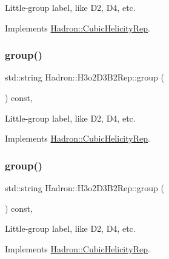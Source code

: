 Little-\/group label, like D2, D4, etc. 

Implements \mbox{\hyperlink{structHadron_1_1CubicHelicityRep_a101a7d76cd8ccdad0f272db44b766113}{Hadron\+::\+Cubic\+Helicity\+Rep}}.

\mbox{\label{structHadron_1_1H3o2D3B2Rep_a5f90a196c20d41622da336eefc77cfd1}} 
\subsubsection{\texorpdfstring{group()}{group()}\hspace{0.1cm}{\footnotesize\ttfamily [3/5]}}
{\footnotesize\ttfamily std\+::string Hadron\+::\+H3o2\+D3\+B2\+Rep\+::group (\begin{DoxyParamCaption}{ }\end{DoxyParamCaption}) const\hspace{0.3cm}{\ttfamily [inline]}, {\ttfamily [virtual]}}

Little-\/group label, like D2, D4, etc. 

Implements \mbox{\hyperlink{structHadron_1_1CubicHelicityRep_a101a7d76cd8ccdad0f272db44b766113}{Hadron\+::\+Cubic\+Helicity\+Rep}}.

\mbox{\label{structHadron_1_1H3o2D3B2Rep_a5f90a196c20d41622da336eefc77cfd1}} 
\subsubsection{\texorpdfstring{group()}{group()}\hspace{0.1cm}{\footnotesize\ttfamily [4/5]}}
{\footnotesize\ttfamily std\+::string Hadron\+::\+H3o2\+D3\+B2\+Rep\+::group (\begin{DoxyParamCaption}{ }\end{DoxyParamCaption}) const\hspace{0.3cm}{\ttfamily [inline]}, {\ttfamily [virtual]}}

Little-\/group label, like D2, D4, etc. 

Implements \mbox{\hyperlink{structHadron_1_1CubicHelicityRep_a101a7d76cd8ccdad0f272db44b766113}{Hadron\+::\+Cubic\+Helicity\+Rep}}.

